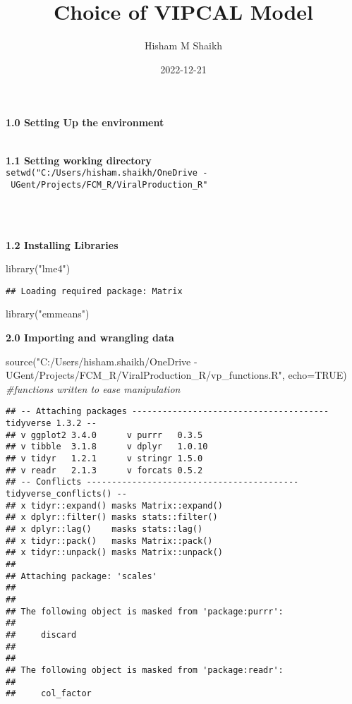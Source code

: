 \documentclass[
]{article}
\title{Choice of VIPCAL Model}
\author{Hisham M Shaikh}
\date{2022-12-21}
\newenvironment{Shaded}{\begin{snugshade}}{\end{snugshade}}
\newcommand{\AttributeTok}[1]{\textcolor[rgb]{0.77,0.63,0.00}{#1}}
\newcommand{\CommentTok}[1]{\textcolor[rgb]{0.56,0.35,0.01}{\textit{#1}}}
\newcommand{\ConstantTok}[1]{\textcolor[rgb]{0.00,0.00,0.00}{#1}}
\newcommand{\FunctionTok}[1]{\textcolor[rgb]{0.00,0.00,0.00}{#1}}
\newcommand{\NormalTok}[1]{#1}
\newcommand{\StringTok}[1]{\textcolor[rgb]{0.31,0.60,0.02}{#1}}
\begin{document}
\maketitle

\textbf{1.0 Setting Up the environment}\\
\strut \\
\textbf{1.1 Setting working directory}\\
\texttt{setwd("C:/Users/hisham.shaikh/OneDrive\ -\ UGent/Projects/FCM\_R/ViralProduction\_R"}\strut \\
\strut \\
\textbf{1.2 Installing Libraries}\\

\begin{Shaded}
\begin{Highlighting}[]
\FunctionTok{library}\NormalTok{(}\StringTok{"lme4"}\NormalTok{)}
\end{Highlighting}
\end{Shaded}

\begin{verbatim}
## Loading required package: Matrix
\end{verbatim}

\begin{Shaded}
\begin{Highlighting}[]
\FunctionTok{library}\NormalTok{(}\StringTok{"emmeans"}\NormalTok{)}
\end{Highlighting}
\end{Shaded}

\hfill\break
\textbf{2.0 Importing and wrangling data}\\

\begin{Shaded}
\begin{Highlighting}[]
\FunctionTok{source}\NormalTok{(}\StringTok{"C:/Users/hisham.shaikh/OneDrive {-} UGent/Projects/FCM\_R/ViralProduction\_R/vp\_functions.R"}\NormalTok{, }\AttributeTok{echo=}\ConstantTok{TRUE}\NormalTok{) }\CommentTok{\#functions written to ease manipulation}
\end{Highlighting}
\end{Shaded}

\begin{verbatim}
## -- Attaching packages --------------------------------------- tidyverse 1.3.2 --
## v ggplot2 3.4.0      v purrr   0.3.5 
## v tibble  3.1.8      v dplyr   1.0.10
## v tidyr   1.2.1      v stringr 1.5.0 
## v readr   2.1.3      v forcats 0.5.2 
## -- Conflicts ------------------------------------------ tidyverse_conflicts() --
## x tidyr::expand() masks Matrix::expand()
## x dplyr::filter() masks stats::filter()
## x dplyr::lag()    masks stats::lag()
## x tidyr::pack()   masks Matrix::pack()
## x tidyr::unpack() masks Matrix::unpack()
## 
## Attaching package: 'scales'
## 
## 
## The following object is masked from 'package:purrr':
## 
##     discard
## 
## 
## The following object is masked from 'package:readr':
## 
##     col_factor
\end{verbatim}
\end{document}
